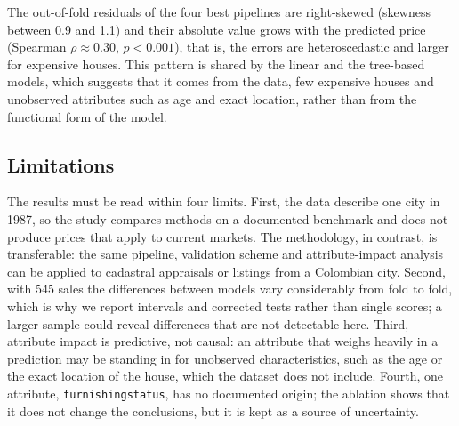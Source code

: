 \documentclass[conference]{IEEEtran}
\begin{document}
The out-of-fold residuals of the four best pipelines are right-skewed (skewness between 0.9 and 1.1) and their absolute value grows with the predicted price (Spearman $\rho \approx 0.30$, $p < 0.001$), that is, the errors are heteroscedastic and larger for expensive houses. This pattern is shared by the linear and the tree-based models, which suggests that it comes from the data, few expensive houses and unobserved attributes such as age and exact location, rather than from the functional form of the model.

\subsection{Limitations}

The results must be read within four limits. First, the data describe one city in 1987, so the study compares methods on a documented benchmark and does not produce prices that apply to current markets. The methodology, in contrast, is transferable: the same pipeline, validation scheme and attribute-impact analysis can be applied to cadastral appraisals or listings from a Colombian city. Second, with 545 sales the differences between models vary considerably from fold to fold, which is why we report intervals and corrected tests rather than single scores; a larger sample could reveal differences that are not detectable here. Third, attribute impact is predictive, not causal: an attribute that weighs heavily in a prediction may be standing in for unobserved characteristics, such as the age or the exact location of the house, which the dataset does not include. Fourth, one attribute, \texttt{furnishingstatus}, has no documented origin; the ablation shows that it does not change the conclusions, but it is kept as a source of uncertainty.
\end{document}
